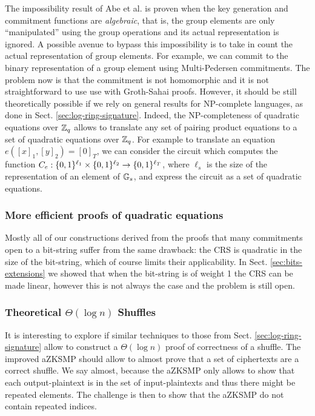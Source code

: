 The impossibility result of Abe et al. is proven when the key generation and commitment functions are \emph{algebraic}, that is, the group elements are only ``manipulated'' using the group operations and its actual representation is ignored.
A possible avenue to bypass this impossibility is to take in count the actual representation of group elements. For example, we can commit to the binary representation of a group element using Multi-Pedersen commitments. The problem now is that the commitment is not homomorphic and it is not straightforward to use use with Groth-Sahai proofs. However, it should be still theoretically possible if we rely on general results for NP-complete languages, as done in Sect. \ref{sec:log-ring-signature}.
Indeed, the NP-completeness of quadratic equations over $\mathbb{Z}_q$ allows to translate any set of pairing product equations to a set of quadratic equations over $\mathbb{Z}_q$. For example to translate an equation $e([x]_1,[y]_2)=[0]_T$, we can consider the circuit which computes the function $C_e:\{0,1\}^{\ell_1}\times \{0,1\}^{\ell_2} \to\{0,1\}^{\ell_T}$, where $\ell_s$ is the size of the representation of an element of $\mathbb{G}_s$, and express the circuit as a set of quadratic equations.

\subsubsection{More efficient proofs of quadratic equations}
Mostly all of our constructions derived from the proofs that many commitments open to a bit-string suffer from the same drawback: the CRS is quadratic in the size of the bit-string, which of course limits their applicability. In Sect. \ref{sec:bits-extensions} we showed that when the bit-string is of weight 1 the CRS can be made linear, however this is not always the case and the problem is still open.
 
\subsubsection{Theoretical $\Theta(\log n)$ Shuffles}
It is interesting to explore if similar techniques to those from Sect. \ref{sec:log-ring-signature} allow to construct a $\Theta(\log n)$ proof of correctness of a shuffle. The improved aZKSMP should allow to almost prove that a set of ciphertexts are a correct shuffle. We say almost, because the aZKSMP only allows to show that each output-plaintext is in the set of input-plaintexts and thus there might be repeated elements. The challenge is then to show that the aZKSMP do not contain repeated indices.

